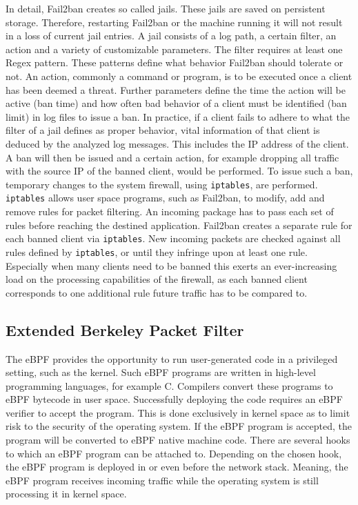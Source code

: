 In detail, Fail2ban creates so called jails.
These jails are saved on persistent storage.
Therefore, restarting Fail2ban or the machine running it will not result in a loss of current jail entries.
A jail consists of a log path, a certain filter, an action and a variety of customizable parameters.
The filter requires at least one \ac{Regex} pattern.
These patterns define what behavior Fail2ban should tolerate or not.
An action, commonly a command or program, is to be executed once a client has been deemed a threat.
Further parameters define the time the action will be active (ban time) and how often bad behavior of a client must be identified (ban limit) in log files to issue a ban.
In practice, if a client fails to adhere to what the filter of a jail defines as proper behavior, vital information of that client is deduced by the analyzed log messages.
This includes the \ac{IP} address of the client.
A ban will then be issued and a certain action, for example dropping all traffic with the source \ac{IP} of the banned client, would be performed.
To issue such a ban, temporary changes to the system firewall, using \texttt{iptables}, are performed.
\texttt{iptables} allows user space programs, such as Fail2ban, to modify, add and remove rules for packet filtering.
An incoming package has to pass each set of rules before reaching the destined application.
Fail2ban creates a separate rule for each banned client via \texttt{iptables}.
New incoming packets are checked against all rules defined by \texttt{iptables}, or until they infringe upon at least one rule.
Especially when many clients need to be banned this exerts an ever-increasing load on the processing capabilities of the firewall, as each banned client corresponds to one additional rule future traffic has to be compared to.\cite{mikolajczak:ebpf}

\subsection{Extended Berkeley Packet Filter}
The \ac{eBPF} provides the opportunity to run user-generated code in a privileged setting, such as the kernel.
Such \ac{eBPF} programs are written in high-level programming languages, for example C.
Compilers convert these programs to \ac{eBPF} bytecode in user space.
Successfully deploying the code requires an \ac{eBPF} verifier to accept the program.
This is done exclusively in kernel space as to limit risk to the security of the operating system.
If the \ac{eBPF} program is accepted, the program will be converted to \ac{eBPF} native machine code.
There are several hooks to which an \ac{eBPF} program can be attached to.
Depending on the chosen hook, the \ac{eBPF} program is deployed in or even before the network stack.
Meaning, the \ac{eBPF} program receives incoming traffic while the operating system is still processing it in kernel space.\cite{mikolajczak:ebpf}

